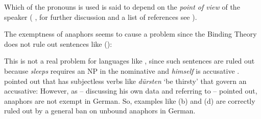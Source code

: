 \documentclass[output=paper
 	        ,biblatex
                ,babelshorthands
                ,newtxmath
                ,draftmode
                ,colorlinks, citecolor=brown
]{langscibook}
\begin{document}
\noindent
Which of the pronouns is used is said to depend on the \emph{point of view} of the speaker
(%
\citealp{Kuroda1973a-u}, for further discussion and a list of references see \citealp[]{ps2}).


The exemptness of anaphors seems to cause a problem since the Binding Theory does not rule out sentences like ():
\z
{}

This is not a real problem for languages like , since such sentences are ruled out because \emph{sleeps}
requires an NP in the nominative and \emph{himself} is accusative \parencites[]{Brame77}[]{ps2}.
\citet[Section~20.4.6]{Mueller99a} pointed out that  has subjectless verbs like
\emph{dürsten} `be thirsty' that govern an accusative:
\eal
{}
\zl
However, as \citet[, 161]{Kiss2012a} -- discussing his own data and referring to
\citet[]{Frey93a} -- pointed out, anaphors are not exempt in German. So, examples like
(b) and (d) are correctly ruled out by a general ban on unbound anaphors in German.
\end{document}
